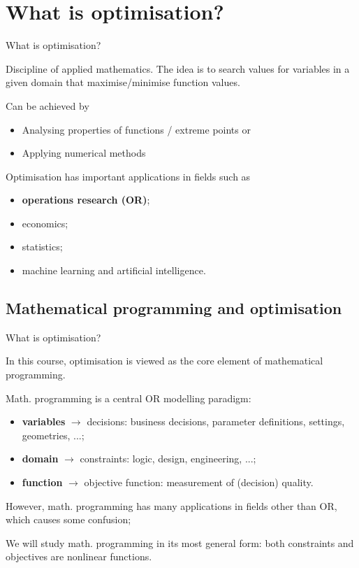 \section{What is optimisation?}


\begin{frame}{What is optimisation?}

	Discipline of applied mathematics. The idea is to search values for \alert{variables}\hspace{-1pt} in a given \alert{domain} that\hspace{-1pt} maximise/minimise\hspace{-1pt} \alert{function values}. 
	
	Can be achieved by 
	\begin{itemize}[<+->]
	\item Analysing properties of functions \hspace{-1pt}/ extreme points or
	\item Applying numerical methods 
	\end{itemize}
	\onslide<+->
	
	Optimisation has important applications in fields such as 
	\begin{itemize}
	\item {\bf operations research (OR)};
	\item economics;
	\item statistics; 
	\item machine learning and artificial intelligence.
	\end{itemize}

\end{frame}


\subsection{Mathematical programming and optimisation}


\begin{frame}{What is optimisation?}

	In this course, optimisation is viewed as the core element of \alert{mathematical programming}.
	
	Math. programming is a central OR modelling paradigm:
	\begin{itemize}[<+->]
	\item {\bf variables} $\rightarrow$ decisions: business decisions, parameter definitions, settings, geometries, ...;
	\item {\bf domain} $\rightarrow$ constraints: logic, design, engineering, ...;
	\item {\bf function} $\rightarrow$ objective function: measurement of (decision) quality. 
	\end{itemize}
	
	\onslide<+->
	However, math. programming has many applications in fields other than OR, \alert{which causes some confusion}; 
	
	We will study math. programming in its most general form: both constraints and objectives are \alert{nonlinear} functions.

\end{frame}


